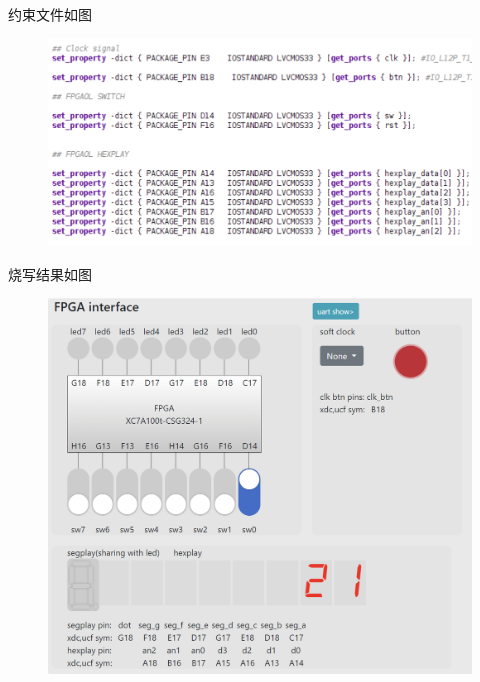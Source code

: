 \documentclass{article}
\begin{document}
		\clearpage
		约束文件如图
		\begin{figure}[htbp]
			\centering
			\includegraphics[scale=0.8]{3x.png}
		\end{figure}

		烧写结果如图
		\begin{figure}[htbp]
			\centering
			\includegraphics[scale=0.5]{3s.png}
		\end{figure}

		\clearpage
\end{document}
